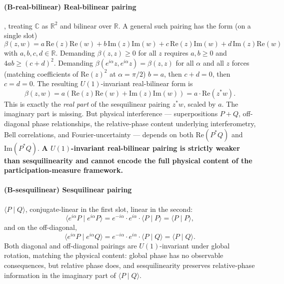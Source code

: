 \documentclass[11pt,a4paper]{article}
\begin{document}
\paragraph{(B-real-bilinear) Real-bilinear pairing}, treating $\mathbb{C}$ as $\mathbb{R}^2$ and bilinear over $\mathbb{R}$. A general such pairing has the form (on a single slot)
\[
\beta(z, w) = a \, \mathrm{Re}(z) \mathrm{Re}(w) + b \, \mathrm{Im}(z) \mathrm{Im}(w) + c \, \mathrm{Re}(z) \mathrm{Im}(w) + d \, \mathrm{Im}(z) \mathrm{Re}(w)
\]
with $a, b, c, d \in \mathbb{R}$. Demanding $\beta(z, z) \geq 0$ for all $z$ requires $a, b \geq 0$ and $4ab \geq (c+d)^2$. Demanding $\beta(e^{i\alpha} z, e^{i\alpha} z) = \beta(z, z)$ for all $\alpha$ and all $z$ forces (matching coefficients of $\mathrm{Re}(z)^2$ at $\alpha = \pi/2$) $b = a$, then $c + d = 0$, then $c = d = 0$. The resulting $U(1)$-invariant real-bilinear form is
\[
\beta(z, w) = a \left( \mathrm{Re}(z) \mathrm{Re}(w) + \mathrm{Im}(z) \mathrm{Im}(w) \right) = a \cdot \mathrm{Re}(z^* w).
\]
This is exactly the \emph{real part} of the sesquilinear pairing $z^* w$, scaled by $a$. The imaginary part is missing. But physical interference --- superpositions $P + Q$, off-diagonal phase relationships, the relative-phase content underlying interferometry, Bell correlations, and Fourier-uncertainty --- depends on both $\mathrm{Re}(P^* Q)$ and $\mathrm{Im}(P^* Q)$. \textbf{A $U(1)$-invariant real-bilinear pairing is strictly weaker than sesquilinearity and cannot encode the full physical content of the participation-measure framework.}

\paragraph{(B-sesquilinear) Sesquilinear pairing} $\langle P \mid Q \rangle$, conjugate-linear in the first slot, linear in the second:
\begin{equation}
\langle e^{i\alpha} P \mid e^{i\alpha} P \rangle = e^{-i\alpha} \cdot e^{i\alpha} \cdot \langle P \mid P \rangle = \langle P \mid P \rangle,
\label{eq:diaginvariance}
\end{equation}
and on the off-diagonal,
\begin{equation}
\langle e^{i\alpha} P \mid e^{i\alpha} Q \rangle = e^{-i\alpha} \cdot e^{i\alpha} \cdot \langle P \mid Q \rangle = \langle P \mid Q \rangle.
\label{eq:offdiaginvariance}
\end{equation}
Both diagonal and off-diagonal pairings are $U(1)$-invariant under global rotation, matching the physical content: global phase has no observable consequences, but relative phase does, and sesquilinearity preserves relative-phase information in the imaginary part of $\langle P \mid Q \rangle$.
\end{document}
